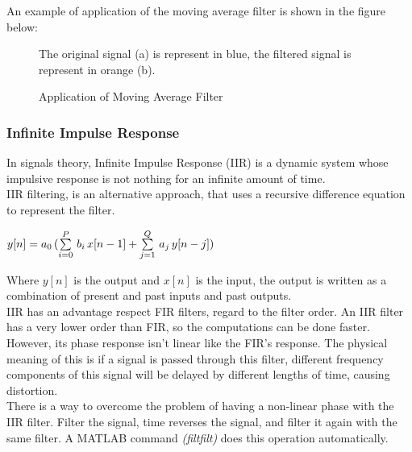\documentclass[tesi]{subfiles}
\begin{document}
\noindent An example of application of the moving average filter is shown in the figure below:
 
\begin{figure}[H]	

\centering
{}

The original signal (a) is represent in blue, the filtered signal is represent in orange (b).
 \caption{Application of Moving Average Filter}
  \label{fig:Application of Moving Average	 Filter.}
\end{figure}
\subsubsection{Infinite Impulse Response} \label{ssc:Infite Impulse Response}
In signals theory, Infinite Impulse Response (IIR) is a dynamic system whose impulsive response is not nothing for an infinite amount of time.\\
IIR filtering, is an alternative approach, that uses a recursive difference equation to represent the filter.
\begin{center}
\begin{large}
$ y[n] = a_{0} \thinspace (\sum\limits_{i=0}^{P}\thinspace  b_{i} \thinspace x[n-1] + \sum\limits_{j=1}^{Q} \thinspace  a_{j} \thinspace  y[n-j])$

\end{large}\end{center}



\noindent Where $y[n]$ is the output and $x[n]$ is the input, the output is written as a combination of present and past inputs and past outputs.\\

\noindent IIR has an advantage respect FIR filters, regard to the filter order. An IIR filter has a very lower order than FIR, so the computations can be done faster. However, its phase response isn’t linear like the FIR’s response. The physical meaning of this is if a signal is passed through this filter, different frequency components of this signal will be delayed by different lengths of time, causing distortion. \\
There is a way to overcome the problem of having a non-linear phase with the IIR filter. 
Filter the signal, time reverses the signal, and filter it again with the same filter. A MATLAB command \textit{(filtfilt) } does this operation automatically. 
\end{document}
